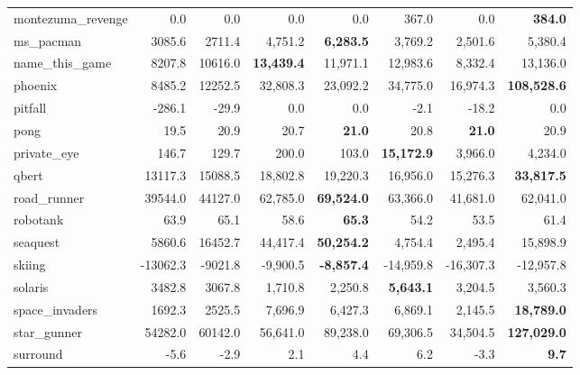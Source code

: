 \documentclass[letterpaper]{article} %
\begin{document}
\begin{table*}[t]
{\begin{tabular}{l|rrrrrrr}
 montezuma\_revenge &       0.0 &       0.0 &         0.0 &        0.0 &          367.0 &        0.0 &     {\bf  384.0 }\\
         ms\_pacman &    3085.6 &    2711.4 &     4,751.2 &   {\bf  6,283.5} &        3,769.2 &    2,501.6 &    5,380.4 \\
    name\_this\_game &    8207.8 &   10616.0 &   {\bf  13,439.4} &   11,971.1 &       12,983.6 &    8,332.4 &   13,136.0 \\
           phoenix &    8485.2 &   12252.5 &    32,808.3 &   23,092.2 &       34,775.0 &   16,974.3 &  {\bf 108,528.6 }\\
           pitfall &    -286.1 &     -29.9 &         0.0 &        0.0 &           -2.1 &      -18.2 &        0.0 \\
              pong &      19.5 &      20.9 &        20.7 &       {\bf 21.0 }&           20.8 &       {\bf 21.0} &       20.9 \\
       private\_eye &     146.7 &     129.7 &       200.0 &      103.0 &       {\bf 15,172.9 }&    3,966.0 &    4,234.0 \\
             qbert &   13117.3 &   15088.5 &    18,802.8 &   19,220.3 &       16,956.0 &   15,276.3 &   {\bf 33,817.5 }\\
       road\_runner &   39544.0 &   44127.0 &    62,785.0 &  {\bf  69,524.0 }&       63,366.0 &   41,681.0 &   62,041.0 \\
          robotank &      63.9 &      65.1 &        58.6 &      {\bf  65.3 }&           54.2 &       53.5 &       61.4 \\
          seaquest &    5860.6 &   16452.7 &    44,417.4 &  {\bf  50,254.2 }&        4,754.4 &    2,495.4 &   15,898.9 \\
            skiing &  -13062.3 &   -9021.8 &    -9,900.5 &  {\bf  -8,857.4} &      -14,959.8 &  -16,307.3 &  -12,957.8 \\
           solaris &    3482.8 &    3067.8 &     1,710.8 &    2,250.8 &      {\bf   5,643.1} &    3,204.5 &    3,560.3 \\
    space\_invaders &    1692.3 &    2525.5 &     7,696.9 &    6,427.3 &        6,869.1 &    2,145.5 &  {\bf  18,789.0 }\\
       star\_gunner &   54282.0 &   60142.0 &    56,641.0 &   89,238.0 &       69,306.5 &   34,504.5 & {\bf  127,029.0} \\
          surround &      -5.6 &      -2.9 &         2.1 &        4.4 &            6.2 &       -3.3 &      {\bf   9.7} \\

\end{tabular}}
\end{table*}
\end{document}
